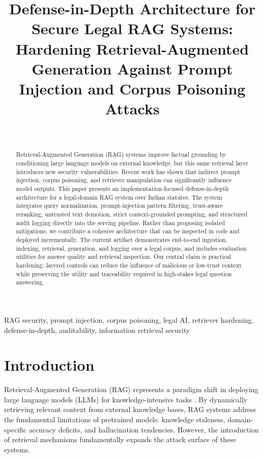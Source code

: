 \documentclass[conference]{IEEEtran}
\title{Defense-in-Depth Architecture for Secure Legal RAG Systems:\\
Hardening Retrieval-Augmented Generation Against Prompt Injection and Corpus Poisoning Attacks}
\author{\IEEEauthorblockN{Jasveer Panwar}\\
\IEEEauthorblockA{\textit{Department of Computer Science and Engineering}\\
\textit{Sardar Vallabhbhai National Institute of Technology, Surat}\\
Surat, India\\
Guided by: Dr. B.L. Parne}}
\begin{document}
\maketitle

\begin{abstract}
Retrieval-Augmented Generation (RAG) systems improve factual grounding by conditioning large language models on external knowledge, but this same retrieval layer introduces new security vulnerabilities. Recent work has shown that indirect prompt injection, corpus poisoning, and retriever manipulation can significantly influence model outputs. This paper presents an implementation-focused defense-in-depth architecture for a legal-domain RAG system over Indian statutes. The system integrates query normalization, prompt-injection pattern filtering, trust-aware reranking, untrusted text demotion, strict context-grounded prompting, and structured audit logging directly into the serving pipeline. Rather than proposing isolated mitigations, we contribute a cohesive architecture that can be inspected in code and deployed incrementally. The current artifact demonstrates end-to-end ingestion, indexing, retrieval, generation, and logging over a legal corpus, and includes evaluation utilities for answer quality and retrieval inspection. Our central claim is practical hardening: layered controls can reduce the influence of malicious or low-trust context while preserving the utility and traceability required in high-stakes legal question answering.
\end{abstract}

\begin{IEEEkeywords}
RAG security, prompt injection, corpus poisoning, legal AI, retriever hardening, defense-in-depth, auditability, information retrieval security
\end{IEEEkeywords}

\section{Introduction}

Retrieval-Augmented Generation (RAG) represents a paradigm shift in deploying large language models (LLMs) for knowledge-intensive tasks \cite{b4}. By dynamically retrieving relevant context from external knowledge bases, RAG systems address the fundamental limitations of pretrained models: knowledge staleness, domain-specific accuracy deficits, and hallucination tendencies. However, the introduction of retrieval mechanisms fundamentally expands the attack surface of these systems.
\end{document}
